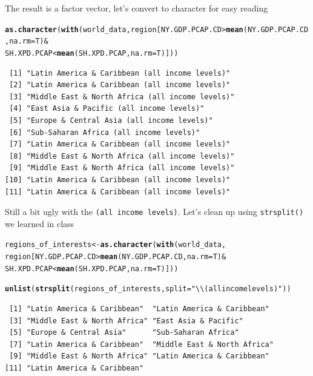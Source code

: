 \documentclass{article}\usepackage[]{graphicx}\usepackage[]{color}
\makeatletter
\newcommand{\hlstr}[1]{\textcolor[rgb]{0.192,0.494,0.8}{#1}}%
\newcommand{\hlopt}[1]{\textcolor[rgb]{0,0,0}{#1}}%
\newcommand{\hlstd}[1]{\textcolor[rgb]{0.345,0.345,0.345}{#1}}%
\newcommand{\hlkwb}[1]{\textcolor[rgb]{0.69,0.353,0.396}{#1}}%
\newcommand{\hlkwc}[1]{\textcolor[rgb]{0.333,0.667,0.333}{#1}}%
\newcommand{\hlkwd}[1]{\textcolor[rgb]{0.737,0.353,0.396}{\textbf{#1}}}%
\newenvironment{kframe}{%
 \def\at@end@of@kframe{}%
 \ifinner\ifhmode%
  \def\at@end@of@kframe{\end{minipage}}%
  \begin{minipage}{\columnwidth}%
 \fi\fi%
 \def\FrameCommand##1{\hskip\@totalleftmargin \hskip-\fboxsep
 \colorbox{shadecolor}{##1}\hskip-\fboxsep
     \hskip-\linewidth \hskip-\@totalleftmargin \hskip\columnwidth}%
 \MakeFramed {\advance\hsize-\width
   \@totalleftmargin\z@ \linewidth\hsize
   \@setminipage}}%
 {\par\unskip\endMakeFramed%
 \at@end@of@kframe}
\newenvironment{knitrout}{}{} %
\makeatother
\begin{document}
\begin{enumerate}
The result is a factor vector, let's convert to character for easy reading

\begin{knitrout}
\color{fgcolor}\begin{kframe}
\begin{alltt}
\hlkwd{as.character}\hlstd{(}\hlkwd{with}\hlstd{(world_data, region[NY.GDP.PCAP.CD} \hlopt{>} \hlkwd{mean}\hlstd{(NY.GDP.PCAP.CD,} \hlkwc{na.rm}\hlstd{=T)} \hlopt{&}
                           \hlstd{SH.XPD.PCAP} \hlopt{<} \hlkwd{mean}\hlstd{(SH.XPD.PCAP,} \hlkwc{na.rm}\hlstd{=T)]))}
\end{alltt}
\begin{verbatim}
 [1] "Latin America & Caribbean (all income levels)" 
 [2] "Latin America & Caribbean (all income levels)" 
 [3] "Middle East & North Africa (all income levels)"
 [4] "East Asia & Pacific (all income levels)"       
 [5] "Europe & Central Asia (all income levels)"     
 [6] "Sub-Saharan Africa (all income levels)"        
 [7] "Latin America & Caribbean (all income levels)" 
 [8] "Middle East & North Africa (all income levels)"
 [9] "Middle East & North Africa (all income levels)"
[10] "Latin America & Caribbean (all income levels)" 
[11] "Latin America & Caribbean (all income levels)" 
\end{verbatim}
\end{kframe}
\end{knitrout}

Still a bit ugly with the \verb`(all income levels)`. Let's clean up using \verb`strsplit()` we learned in class
\begin{knitrout}
\color{fgcolor}\begin{kframe}
\begin{alltt}
\hlstd{regions_of_interests} \hlkwb{<-} \hlkwd{as.character}\hlstd{(}\hlkwd{with}\hlstd{(world_data,}
  \hlstd{region[NY.GDP.PCAP.CD} \hlopt{>} \hlkwd{mean}\hlstd{(NY.GDP.PCAP.CD,} \hlkwc{na.rm}\hlstd{=T)} \hlopt{&}
  \hlstd{SH.XPD.PCAP} \hlopt{<} \hlkwd{mean}\hlstd{(SH.XPD.PCAP,} \hlkwc{na.rm}\hlstd{=T)]))}

\hlkwd{unlist}\hlstd{(}\hlkwd{strsplit}\hlstd{(regions_of_interests,} \hlkwc{split}\hlstd{=}\hlstr{" \textbackslash{}\textbackslash{}(all income levels)"}\hlstd{))}
\end{alltt}
\begin{verbatim}
 [1] "Latin America & Caribbean"  "Latin America & Caribbean" 
 [3] "Middle East & North Africa" "East Asia & Pacific"       
 [5] "Europe & Central Asia"      "Sub-Saharan Africa"        
 [7] "Latin America & Caribbean"  "Middle East & North Africa"
 [9] "Middle East & North Africa" "Latin America & Caribbean" 
[11] "Latin America & Caribbean" 
\end{verbatim}
\end{kframe}
\end{knitrout}

\end{enumerate}
\end{document}
